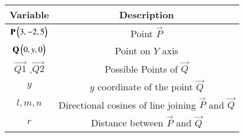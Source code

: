 \begin{tabular}[12pt]{ |c| c|}
    \hline
    \textbf{Variable} & \textbf{Description}\\ 
    \hline
	$\mathbf{P}\begin{pmatrix}3,-2,5\end{pmatrix}$ & Point $\vec{P}$ \\
    \hline 
	$\mathbf{Q}\begin{pmatrix}0,y,0\end{pmatrix}$ & Point on $Y$ axis  \\
    \hline
	$\vec{Q1}$ ,$\vec{Q2}$ & Possible Points of $\vec{Q}$\\
    \hline
	$y$ & $y$ coordinate of the point $\vec{Q}$\\
    \hline
	$l,m,n$ & Directional cosines of line joining $\vec{P}$ and $\vec{Q}$\\
    \hline
	$r$ & Distance between $\vec{P}$ and $\vec{Q}$\\
    \hline	
\end{tabular}
